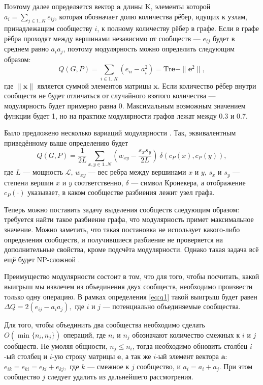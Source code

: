 \documentclass{matmex-diploma}
\begin{document}
Поэтому далее определяется вектор $\mathbf{a}$ длины K, элементы которой $a_i = \sum_{j \in 1..K}{e_{ij}}$, которая обозначает долю количества рёбер, идущих к узлам, принадлежащим сообществу $i$, к полному количеству рёбер в графе. Если в графе рёбра проходят между вершинами независимо от сообществ --- $e_{ij}$ будет в среднем равно $a_i a_j$, поэтому модулярность можно определить следующим образом:
\begin{equation} \label{eq:q1}
Q(G, P) = \sum_{i \in 1..K}{\left(e_{ii} - a_i^2\right)} = \mathrm{Tr} \mathbf{e} - \|\mathbf{e}^2\|,
\end{equation}
где $\|\mathbf{x}\|$ является суммой элементов матрицы $\mathbf{x}$. Если количество рёбер внутри сообществ не будет отличаться от случайного взятого количества --- модулярность будет примерно равна 0. Максимальным возможным значением функции будет 1, но на практике модулярности графов лежат между 0.3 и 0.7.

Было предложено несколько вариаций модулярности \cite{Muff&Rao&Caflisch:2005, Fortunato&Barthelemy:2007}. Так, эквивалентным приведённому выше определению будет
\begin{equation}
Q(G, P) = \frac{1}{2L} \sum_{x, y \in 1..N} \left(w_{xy} - \frac{s_x s_y}{2L}\right)\ \delta(c_P(x), c_P(y)),
\end{equation}
где $L$ --- мощность $\mathscr{L}$, $w_{xy}$ --- вес ребра между вершинами $x$ и $y$, $s_x$ и $s_y$ --- степени вершин $x$ и $y$ соответственно, $\delta$ --- символ Кронекера, а отображение $c_P(\cdot)$ указывает, в каком сообществе разбиения лежит узел графа.

Теперь можно поставить задачу выделения сообществ следующим образом: требуется найти такое разбиение графа, что модулярность примет максимальное значение. Можно заметить, что такая постановка не использует какого-либо определения сообществ, и получившиеся разбиение не проверяется на дополнительные свойства, кроме подсчёта модулярности. Однако такая задача всё ещё будет NP-сложной \cite{Brandes&al:2008}.

Преимущество модулярности состоит в том, что для того, чтобы посчитать, какой выигрыш мы извлечем из объединения двух сообществ, необходимо произвести только одну операцию. В рамках определения \eqref{eq:q1} такой выигрыш будет равен $\Delta Q = 2(e_{ij} - a_i a_j),$ где $i$ и $j$ --- потенциально объединяемые сообщества.

Для того, чтобы объединить два сообщества необходимо сделать $O(\min\{n_i, n_j\})$ операций, где $n_i$ и $n_j$ обозначают количество смежных к $i$ и $j$ сообществ. Не умоляя общности, $n_j \leq n_i$, тогда необходимо обновить столбец $i$-ый столбец и $i$-ую строку матрицы $\mathbf{e}$, а так же $i$-ый элемент вектора $\mathbf{a}$: $e_{ik} = e_{ki} = e_{ki} + e_{kj},$ где $k$ --- смежное к $j$ сообщество, и $a_{i} = a_{i} + a_{j}$. При этом сообщество $j$ следует удалить из дальнейшего рассмотрения.
\end{document}
